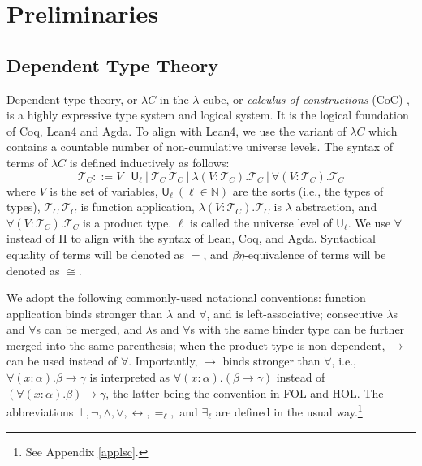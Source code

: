 \section{Preliminaries}

\subsection{Dependent Type Theory}\label{subdtt}

  Dependent type theory, or $\lambda C$ in the $\lambda$-cube,
  or \textit{calculus of constructions} (CoC) \cite{LambdaWithType},
  is a highly expressive type system and logical system. It is the logical
  foundation of Coq, Lean4 and Agda. To align with
  Lean4, we use the variant of $\lambda C$ which contains a countable
  number of non-cumulative universe levels. The syntax of terms of $\lambda C$ is defined
  inductively as follows:
  $$\mathcal{T}_C ::= V \ | \ \mathsf{U}_\ell \ | \ \mathcal{T}_C \ \mathcal{T}_C \ |
    \ \lambda (V : \mathcal{T}_C). \mathcal{T}_C \ | \ \forall (V : \mathcal{T}_C). \mathcal{T}_C$$
  where $V$ is the set of variables, $\mathsf{U}_\ell\ (\ell \in \mathbb{N})$ are
  the sorts (i.e., the types of types), $\mathcal{T}_C \ \mathcal{T}_C$ is function application,
  $\lambda (V : \mathcal{T}_C). \mathcal{T}_C$ is $\lambda$ abstraction, and
  $\forall (V : \mathcal{T}_C). \mathcal{T}_C$ is a product type.
  $\ell$ is called the universe level of $\mathsf{U}_\ell$.
  We use $\forall$ instead of $\mathrm{\Pi}$ to align with the syntax of Lean, Coq, and Agda.
  Syntactical equality of terms will be denoted as $=$, and $\beta\eta$-equivalence of terms will be
  denoted as $\cong$.
  
  We adopt the following commonly-used notational conventions:
  function application binds stronger than $\lambda$ and $\forall$, and is left-associative;
  consecutive $\lambda$s and $\forall$s can be merged, and $\lambda$s and $\forall$s with the same
  binder type can be further merged into the same parenthesis; when the product type is non-dependent,
  $\to$ can be used instead of $\forall$. Importantly, $\to$ binds stronger than $\forall$, i.e.,
  $\forall (x : \alpha). \beta \to \gamma$ is interpreted as $\forall (x : \alpha). (\beta \to \gamma)$
  instead of $(\forall (x : \alpha). \beta) \to \gamma$, the latter being the convention in
  FOL and HOL. The abbreviations $\bot, \neg, \land, \lor, \leftrightarrow,
  =_\ell,$ and $\exists_\ell$
  are defined in the usual way.\footnote{See Appendix \ref{applsc}.}

